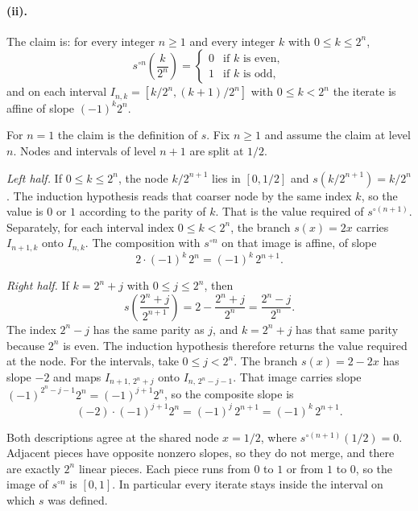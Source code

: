 \paragraph{(ii).}
The claim is: for every integer \(n\ge 1\) and every integer \(k\) with \(0\le k\le 2^n\),
\[
  s^{\circ n}\!\left(\frac{k}{2^n}\right)
  =
  \begin{cases}
    0 & \text{if \(k\) is even},\\
    1 & \text{if \(k\) is odd},
  \end{cases}
\]
and on each interval \(I_{n,k}=[k/2^n,(k+1)/2^n]\) with \(0\le k<2^n\) the iterate is affine of slope \((-1)^k 2^n\).

For \(n=1\) the claim is the definition of \(s\). Fix \(n\ge 1\) and assume the claim at level \(n\). Nodes and intervals of level \(n+1\) are split at \(1/2\).

\emph{Left half.} If \(0\le k\le 2^n\), the node \(k/2^{n+1}\) lies in \([0,1/2]\) and \(s(k/2^{n+1}) = k/2^n\). The induction hypothesis reads that coarser node by the same index \(k\), so the value is \(0\) or \(1\) according to the parity of \(k\). That is the value required of \(s^{\circ(n+1)}\). Separately, for each interval index \(0\le k<2^n\), the branch \(s(x)=2x\) carries \(I_{n+1,k}\) onto \(I_{n,k}\). The composition with \(s^{\circ n}\) on that image is affine, of slope
\[
  2\cdot(-1)^k\,2^n = (-1)^k\,2^{n+1}.
\]

\emph{Right half.} If \(k=2^n+j\) with \(0\le j\le 2^n\), then
\[
  s\!\left(\frac{2^n+j}{2^{n+1}}\right)
  =
  2-\frac{2^n+j}{2^n}
  =
  \frac{2^n-j}{2^n}.
\]
The index \(2^n-j\) has the same parity as \(j\), and \(k=2^n+j\) has that same parity because \(2^n\) is even. The induction hypothesis therefore returns the value required at the node. For the intervals, take \(0\le j<2^n\). The branch \(s(x)=2-2x\) has slope \(-2\) and maps \(I_{n+1,\,2^n+j}\) onto \(I_{n,\,2^n-j-1}\). That image carries slope \((-1)^{2^n-j-1}2^n = (-1)^{j+1}2^n\), so the composite slope is
\[
  (-2)\cdot(-1)^{j+1}2^n = (-1)^j\,2^{n+1} = (-1)^k\,2^{n+1}.
\]

Both descriptions agree at the shared node \(x=1/2\), where \(s^{\circ(n+1)}(1/2)=0\). Adjacent pieces have opposite nonzero slopes, so they do not merge, and there are exactly \(2^n\) linear pieces. Each piece runs from \(0\) to \(1\) or from \(1\) to \(0\), so the image of \(s^{\circ n}\) is \([0,1]\). In particular every iterate stays inside the interval on which \(s\) was defined.

